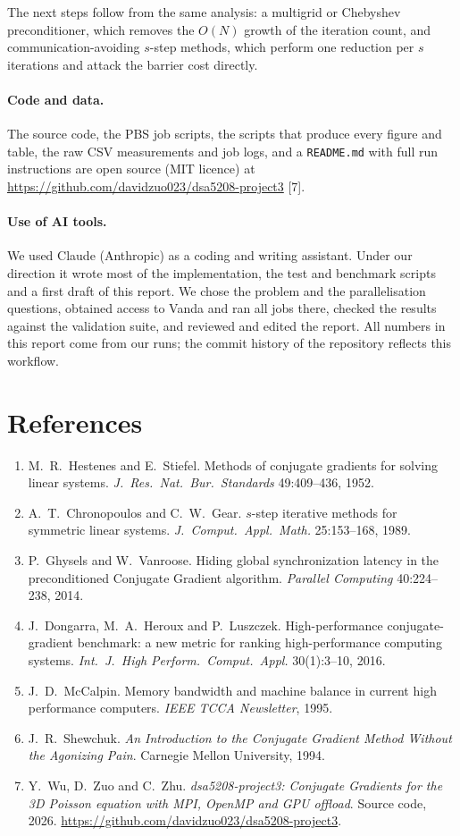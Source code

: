 \documentclass[10pt,a4paper]{article}
\newcommand{\code}[1]{\texttt{#1}}
\begin{document}
The next steps follow from the same analysis: a multigrid or Chebyshev preconditioner, which removes the
$O(N)$ growth of the iteration count, and communication-avoiding $s$-step methods, which perform one
reduction per $s$ iterations and attack the barrier cost directly.

\paragraph{Code and data.} The source code, the PBS job scripts, the scripts that produce every figure and
table, the raw CSV measurements and job logs, and a \code{README.md} with full run instructions are open
source (MIT licence) at \url{https://github.com/davidzuo023/dsa5208-project3} [7].

\paragraph{Use of AI tools.} We used Claude (Anthropic) as a coding and writing assistant. Under our
direction it wrote most of the implementation, the test and benchmark scripts and a first draft of this
report. We chose the problem and the parallelisation questions, obtained access to Vanda and ran all jobs
there, checked the results against the validation suite, and reviewed and edited the report. All numbers
in this report come from our runs; the commit history of the repository reflects this workflow.

\section*{References}
\begin{enumerate}\footnotesize\setlength{\itemsep}{0pt}\setlength{\parsep}{0pt}
\item M.~R.~Hestenes and E.~Stiefel. Methods of conjugate gradients for solving linear systems.
\emph{J.\ Res.\ Nat.\ Bur.\ Standards} 49:409--436, 1952.
\item A.~T.~Chronopoulos and C.~W.~Gear. $s$-step iterative methods for symmetric linear systems.
\emph{J.\ Comput.\ Appl.\ Math.} 25:153--168, 1989.
\item P.~Ghysels and W.~Vanroose. Hiding global synchronization latency in the preconditioned Conjugate
Gradient algorithm. \emph{Parallel Computing} 40:224--238, 2014.
\item J.~Dongarra, M.~A.~Heroux and P.~Luszczek. High-performance conjugate-gradient benchmark: a new metric
for ranking high-performance computing systems. \emph{Int.\ J.\ High Perform.\ Comput.\ Appl.}
30(1):3--10, 2016.
\item J.~D.~McCalpin. Memory bandwidth and machine balance in current high performance computers.
\emph{IEEE TCCA Newsletter}, 1995.
\item J.~R.~Shewchuk. \emph{An Introduction to the Conjugate Gradient Method Without the Agonizing Pain}.
Carnegie Mellon University, 1994.
\item Y.~Wu, D.~Zuo and C.~Zhu. \emph{dsa5208-project3: Conjugate Gradients for the 3D Poisson equation with
MPI, OpenMP and GPU offload}. Source code, 2026. \url{https://github.com/davidzuo023/dsa5208-project3}.
\end{enumerate}
\end{document}
